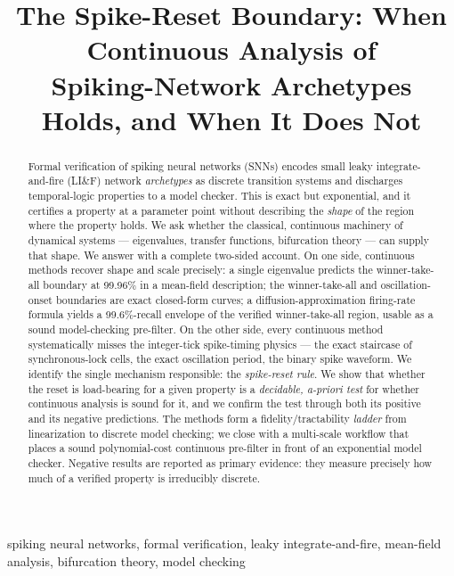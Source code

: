 \documentclass[conference]{IEEEtran}
\begin{document}
\title{The Spike-Reset Boundary: When Continuous Analysis of\\
Spiking-Network Archetypes Holds, and When It Does Not}

\author{
}

\maketitle

\begin{abstract}
Formal verification of spiking neural networks (SNNs) encodes small leaky
integrate-and-fire (LI\&F) network \emph{archetypes} as discrete transition
systems and discharges temporal-logic properties to a model checker. This is
exact but exponential, and it certifies a property at a parameter point without
describing the \emph{shape} of the region where the property holds. We ask
whether the classical, continuous machinery of dynamical systems ---
eigenvalues, transfer functions, bifurcation theory --- can supply that shape.
We answer with a complete two-sided account. On one side, continuous methods
recover shape and scale precisely: a single eigenvalue predicts the
winner-take-all boundary at 99.96\% in a mean-field description; the
winner-take-all and oscillation-onset boundaries are exact closed-form curves;
a diffusion-approximation firing-rate formula yields a 99.6\%-recall envelope
of the verified winner-take-all region, usable as a sound model-checking
pre-filter. On the other side, every continuous method systematically misses
the integer-tick spike-timing physics --- the exact staircase of
synchronous-lock cells, the exact oscillation period, the binary spike
waveform. We identify the single mechanism responsible: the \emph{spike-reset
rule}. We show that whether the reset is load-bearing for a given property is a
\emph{decidable, a-priori test} for whether continuous analysis is sound for
it, and we confirm the test through both its positive and its negative
predictions. The methods form a fidelity/tractability \emph{ladder} from
linearization to discrete model checking; we close with a multi-scale workflow
that places a sound polynomial-cost continuous pre-filter in front of an
exponential model checker. Negative results are reported as primary evidence:
they measure precisely how much of a verified property is irreducibly discrete.
\end{abstract}

\begin{IEEEkeywords}
spiking neural networks, formal verification, leaky integrate-and-fire,
mean-field analysis, bifurcation theory, model checking
\end{IEEEkeywords}
\end{document}
